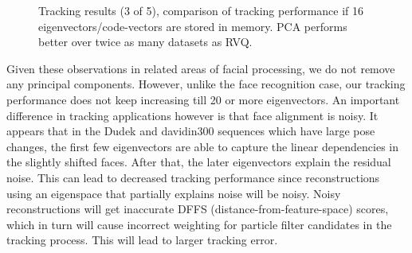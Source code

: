 \begin{Body}
								\begin{figure}[t]
								\centering
								
								\caption{Tracking results (3 of 5), comparison of tracking performance if 16 eigenvectors/code-vectors are stored in memory.  PCA performs better over twice as many datasets as RVQ.}
								\label{fig:results_final_3_16}
								\end{figure}

Given these observations in related areas of facial processing, we do not remove any principal components.  However, unlike the face recognition case, our tracking performance does not keep increasing till 20 or more eigenvectors.  An important difference in tracking applications however is that face alignment is noisy.  It appears that in the Dudek and davidin300 sequences which have large pose changes, the first few eigenvectors are able to capture the linear dependencies in the slightly shifted faces.  After that, the later eigenvectors explain the residual noise.  This can lead to decreased tracking performance since reconstructions using an eigenspace that partially explains noise will be noisy.  Noisy reconstructions will get inaccurate DFFS (distance-from-feature-space) scores, which in turn will cause incorrect weighting for particle filter candidates in the tracking process.  This will lead to larger tracking error.


\end{Body}
